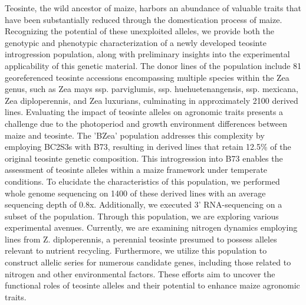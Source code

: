 \documentclass[10pt,letterpaper]{article}
\begin{document}
Teosinte, the wild ancestor of maize, harbors an abundance of valuable traits that have been substantially reduced through the domestication process of maize. Recognizing the potential of these unexploited alleles, we provide both the genotypic and phenotypic characterization of a newly developed teosinte introgression population, along with preliminary insights into the experimental applicability of this genetic material. The donor lines of the population include 81 georeferenced teosinte accessions encompassing multiple species within the Zea genus, such as Zea mays ssp. parviglumis, ssp. huehuetenangensis, ssp. mexicana, Zea diploperennis, and Zea luxurians, culminating in approximately 2100 derived lines. Evaluating the impact of teosinte alleles on agronomic traits presents a challenge due to the photoperiod and growth environment differences between maize and teosinte. The 'BZea' population addresses this complexity by employing BC2S3s with B73, resulting in derived lines that retain 12.5\% of the original teosinte genetic composition. This introgression into B73 enables the assessment of teosinte alleles within a maize framework under temperate conditions. To elucidate the characteristics of this population, we performed whole genome sequencing on 1400 of these derived lines with an average sequencing depth of 0.8x. Additionally, we executed 3’ RNA-sequencing on a subset of the population. Through this population, we are exploring various experimental avenues. Currently, we are examining nitrogen dynamics employing lines from Z. diploperennis, a perennial teosinte presumed to possess alleles relevant to nutrient recycling. Furthermore, we utilize this population to construct allelic series for numerous candidate genes, including those related to nitrogen and other environmental factors. These efforts aim to uncover the functional roles of teosinte alleles and their potential to enhance maize agronomic traits.
\end{document}
